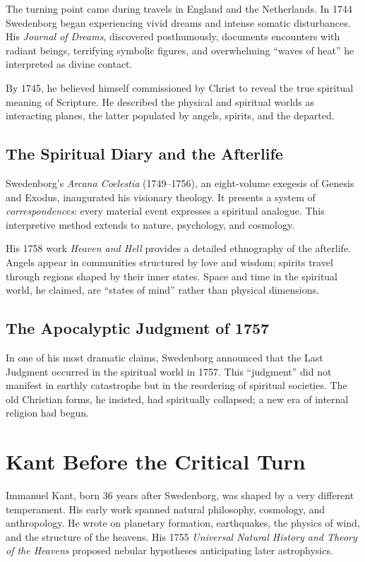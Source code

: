 \documentclass[12pt]{article}
\begin{document}
The turning point came during travels in England and the Netherlands. In 1744 
Swedenborg began experiencing vivid dreams and intense somatic disturbances. 
His \emph{Journal of Dreams}, discovered posthumously, documents encounters 
with radiant beings, terrifying symbolic figures, and overwhelming ``waves of 
heat'' he interpreted as divine contact.

By 1745, he believed himself commissioned by Christ to reveal the true 
spiritual meaning of Scripture. He described the physical and spiritual worlds 
as interacting planes, the latter populated by angels, spirits, and the 
departed.

\subsection{The Spiritual Diary and the Afterlife}

Swedenborg’s \emph{Arcana Coelestia} (1749--1756), an eight-volume exegesis of 
Genesis and Exodus, inaugurated his visionary theology. It presents a system 
of \emph{correspondences}: every material event expresses a spiritual analogue. 
This interpretive method extends to nature, psychology, and cosmology.

His 1758 work \emph{Heaven and Hell} provides a detailed ethnography of the 
afterlife. Angels appear in communities structured by love and wisdom; spirits 
travel through regions shaped by their inner states. Space and time in the 
spiritual world, he claimed, are ``states of mind'' rather than physical 
dimensions.

\subsection{The Apocalyptic Judgment of 1757}

In one of his most dramatic claims, Swedenborg announced that the Last Judgment 
occurred in the spiritual world in 1757. This ``judgment'' did not manifest in 
earthly catastrophe but in the reordering of spiritual societies. The old 
Christian forms, he insisted, had spiritually collapsed; a new era of internal 
religion had begun.

\section{Kant Before the Critical Turn}

Immanuel Kant, born 36 years after Swedenborg, was shaped by a very different 
temperament. His early work spanned natural philosophy, cosmology, and 
anthropology. He wrote on planetary formation, earthquakes, the physics of 
wind, and the structure of the heavens. His 1755 \emph{Universal Natural 
History and Theory of the Heavens} proposed nebular hypotheses anticipating 
later astrophysics.
\end{document}
